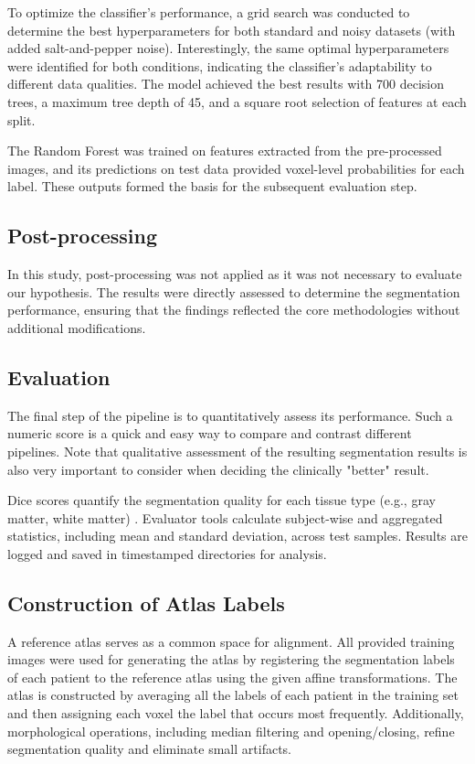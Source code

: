 To optimize the classifier’s performance, a grid search was conducted to determine the best hyperparameters for both standard and noisy datasets (with added salt-and-pepper noise). Interestingly, the same optimal hyperparameters were identified for both conditions, indicating the classifier’s adaptability to different data qualities. The model achieved the best results with 700 decision trees, a maximum tree depth of 45, and a square root selection of features at each split.

The Random Forest was trained on features extracted from the pre-processed images, and its predictions on test data provided voxel-level probabilities for each label. These outputs formed the basis for the subsequent evaluation step.


\subsection{Post-processing}

In this study, post-processing was not applied as it was not necessary to evaluate our hypothesis. The results were directly assessed to determine the segmentation performance, ensuring that the findings reflected the core methodologies without additional modifications.


\subsection{Evaluation}

The final step of the pipeline is to quantitatively assess its performance. Such a numeric score is a quick and easy way to compare and contrast different pipelines. Note that qualitative assessment of the resulting segmentation results is also very important to consider when deciding the clinically "better" result.

Dice scores quantify the segmentation quality for each tissue type (e.g., gray matter, white matter) \cite{b12}. Evaluator tools calculate subject-wise and aggregated statistics, including mean and standard deviation, across test samples. Results are logged and saved in timestamped directories for analysis.

\subsection{Construction of Atlas Labels}
A reference atlas serves as a common space for alignment. All provided training images were used for generating the atlas by registering the segmentation labels of each patient to the reference atlas using the given affine transformations.  The atlas is constructed by averaging all the labels of each patient in the training set and then assigning each voxel the label that occurs most frequently. Additionally, morphological operations, including median filtering and opening/closing, refine segmentation quality and eliminate small artifacts.





